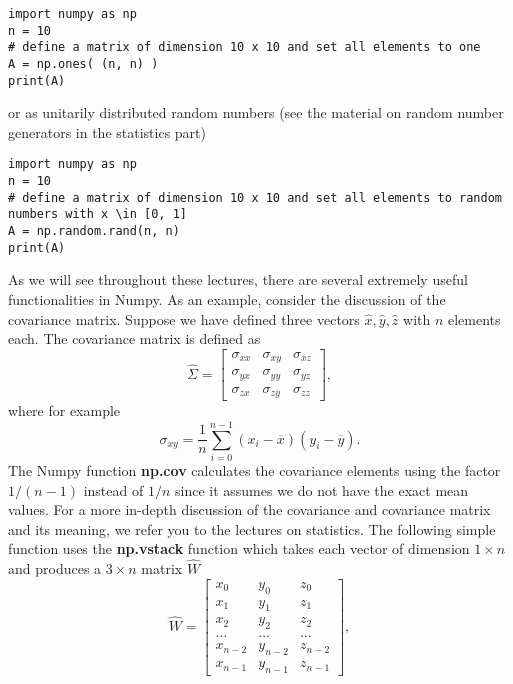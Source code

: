 \documentclass[%
oneside,                 %
final,                   %
10pt]{article}
\begin{document}
\begin{verbatim}
import numpy as np
n = 10
# define a matrix of dimension 10 x 10 and set all elements to one
A = np.ones( (n, n) )
print(A) 
\end{verbatim}
or as unitarily distributed random numbers (see the material on random number generators in the statistics part)
\begin{verbatim}
import numpy as np
n = 10
# define a matrix of dimension 10 x 10 and set all elements to random numbers with x \in [0, 1]
A = np.random.rand(n, n)
print(A) 
\end{verbatim}

As we will see throughout these lectures, there are several extremely useful functionalities in Numpy.
As an example, consider the discussion of the covariance matrix. Suppose we have defined three vectors
$\hat{x}, \hat{y}, \hat{z}$ with $n$ elements each. The covariance matrix is defined as 
\[
\hat{\Sigma} = \begin{bmatrix} \sigma_{xx} & \sigma_{xy} & \sigma_{xz} \\
                              \sigma_{yx} & \sigma_{yy} & \sigma_{yz} \\
                              \sigma_{zx} & \sigma_{zy} & \sigma_{zz} 
             \end{bmatrix},
\]
where for example
\[
\sigma_{xy} =\frac{1}{n} \sum_{i=0}^{n-1}(x_i- \overline{x})(y_i- \overline{y}).
\]
The Numpy function \textbf{np.cov} calculates the covariance elements using the factor $1/(n-1)$ instead of $1/n$ since it assumes we do not have the exact mean values. For a more in-depth discussion of the covariance and covariance matrix and its meaning, we refer you to the lectures on statistics. 
The following simple function uses the \textbf{np.vstack} function which takes each vector of dimension $1\times n$ and produces a $ 3\times n$ matrix $\hat{W}$
\[
\hat{W} = \begin{bmatrix} x_0 & y_0 & z_0 \\
                          x_1 & y_1 & z_1 \\
                          x_2 & y_2 & z_2 \\
                          \dots & \dots & \dots \\
                          x_{n-2} & y_{n-2} & z_{n-2} \\
                          x_{n-1} & y_{n-1} & z_{n-1}
             \end{bmatrix},
\]
\end{document}
